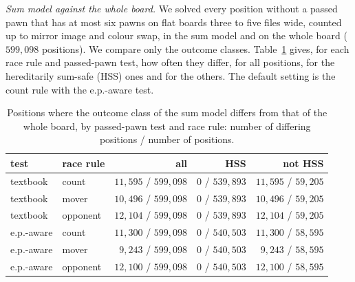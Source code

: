 \emph{Sum model against the whole board.} We solved every position without a passed pawn that has at most six
pawns on flat boards three to five files wide, counted up to mirror image and colour swap, in the sum model and on the
whole board ($599{,}098$ positions). We compare only the outcome classes. Table~\ref{tab:censusSW} gives, for each
race rule and passed-pawn test, how often they differ, for all positions, for the hereditarily sum-safe (HSS) ones
and for the others. The default setting is the count rule with the e.p.-aware test.

\begin{table}[!htbp]
\centering
\caption{Positions where the outcome class of the sum model differs from that of the whole board, by passed-pawn
test and race rule: number of differing positions / number of positions.}
\label{tab:censusSW}
\footnotesize
\begin{tabular}{@{}llrrr@{}}
\toprule
test & race rule & all & HSS & not HSS\\
\midrule
textbook & count & $11{,}595$ / $599{,}098$ & $0$ / $539{,}893$ & $11{,}595$ / $59{,}205$\\
textbook & mover & $10{,}496$ / $599{,}098$ & $0$ / $539{,}893$ & $10{,}496$ / $59{,}205$\\
textbook & opponent & $12{,}104$ / $599{,}098$ & $0$ / $539{,}893$ & $12{,}104$ / $59{,}205$\\
e.p.-aware & count & $11{,}300$ / $599{,}098$ & $0$ / $540{,}503$ & $11{,}300$ / $58{,}595$\\
e.p.-aware & mover & $9{,}243$ / $599{,}098$ & $0$ / $540{,}503$ & $9{,}243$ / $58{,}595$\\
e.p.-aware & opponent & $12{,}100$ / $599{,}098$ & $0$ / $540{,}503$ & $12{,}100$ / $58{,}595$\\
\bottomrule
\end{tabular}
\end{table}


